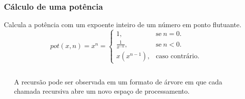 \documentclass[10pt]{beamer}
\begin{document}
\begin{frame}[t]
  \frametitle{Cálculo de uma potência}
  Calcula a potência com um expoente inteiro de um número em ponto flutuante.
  \begin{equation*}
    pot(x,n)=x^n=\begin{cases}
      1,                & \text{se}\ n=0.        \\
      \frac{1}{x^{-n}}, & \text{se}\ n<0.        \\
      x(x^{n-1}),       & \text{caso contrário}.
    \end{cases}
  \end{equation*}
  \begin{columns}[t]
    \begin{column}{0.5\textwidth}
    \end{column}
    \begin{column}{0.5\textwidth}
      A recursão pode ser observada em um formato de árvore em que cada chamada recursiva abre um novo espaço de processamento.
    \end{column}
  \end{columns}
\end{frame}
\end{document}
